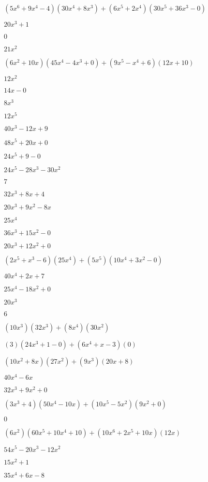 \documentclass{article}
\begin{document}
\begin{multicols}{2}
$(5x^{6}+9x^{4}-4)(30x^{4}+8x^{3})+(6x^{5}+2x^{4})(30x^{5}+36x^{3}-0)$\item $20x^{3}+1$\item $0$\item $21x^{2}$\item $(6x^2+10x)(45x^{4}-4x^{3}+0)+(9x^{5}-x^{4}+6)(12x+10)$\item $12x^{2}$\item $14x-0$\item $8x^{3}$\item $12x^{5}$\item $40x^{3}-12x+9$\item $48x^{5}+20x+0$\item $24x^{5}+9-0$\item $24x^{5}-28x^{3}-30x^{2}$\item $7$\item $32x^{3}+8x+4$\item $20x^{3}+9x^{2}-8x$\item $25x^{4}$\item $36x^{3}+15x^{2}-0$\item $20x^{3}+12x^{2}+0$\item $(2x^{5}+x^{3}-6)(25x^{4})+(5x^{5})(10x^{4}+3x^{2}-0)$\item $40x^{4}+2x+7$\item $25x^{4}-18x^{2}+0$\item $20x^{3}$\item $6$\item $(10x^{3})(32x^{3})+(8x^{4})(30x^{2})$\item $(3)(24x^{3}+1-0)+(6x^{4}+x-3)(0)$\item $(10x^2+8x)(27x^{2})+(9x^{3})(20x+8)$\item $40x^{4}-6x$\item $32x^{3}+9x^{2}+0$\item $(3x^{3}+4)(50x^{4}-10x)+(10x^{5}-5x^2)(9x^{2}+0)$\item $0$\item $(6x^2)(60x^{5}+10x^{4}+10)+(10x^{6}+2x^{5}+10x)(12x)$\item $54x^{5}-20x^{3}-12x^{2}$\item $15x^{2}+1$\item $35x^{4}+6x-8$\item 
\end{multicols}
\end{document}
